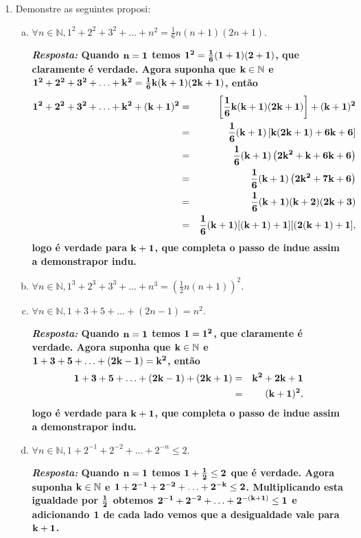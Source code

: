 \begin{enumerate}[{\bf 1.}]
\item Demonstre as seguintes proposi\cois:
\begin{enumerate}[a)]
\item $\forall n\in\mathbb{N}, 1^2+2^2+3^2+\ldots+n^2=\frac{1}{6}n(n+1)(2n+1)$.

{\bf{\it Resposta:} Quando ${\bf n=1}$ temos ${\bf 1^2=\frac{1}{6}(1+1)(2+1)}$, que claramente é verdade. Agora suponha que ${\bf k\in\mathbb{N}}$ e ${\bf 1^2+2^2+3^2+\ldots+k^2=\frac{1}{6}k(k+1)(2k+1)}$, então
\begin{eqnarray*}
{\bf 1^2+2^2+3^2+\ldots+k^2+(k+1)^2}&=&{\bf  \left[\frac{1}{6}k(k+1)(2k+1)\right]+(k+1)^2}\\
                          &=&{\bf  \frac{1}{6}(k+1)\left[k(2k+1)+6k+6\right]}\\
                          &=&{\bf  \frac{1}{6}(k+1)\left(2k^2+k+6k+6\right)}\\
                          &=&{\bf  \frac{1}{6}(k+1)\left(2k^2+7k+6\right)}\\
                          &=&{\bf  \frac{1}{6}(k+1)(k+2)(2k+3)}\\
                          &=&{\bf  \frac{1}{6}(k+1)[(k+1)+1][(2(k+1)+1]},
\end{eqnarray*}  
logo \'e verdade para ${\bf k+1}$, que completa o passo de indu\cao e assim a demonstra\cao por indu\caoi.}

\item $\forall n\in\mathbb{N}, 1^3+2^3+3^3+\ldots+n^3=(\frac{1}{2}n(n+1))^2$.
\item $\forall n\in\mathbb{N}, 1+3+5+\ldots+(2n-1)=n^2$.

{\bf{\it Resposta:} Quando ${\bf n=1}$ temos ${\bf 1=1^2}$, que claramente é verdade. Agora suponha que ${\bf k\in\mathbb{N}}$ e ${\bf 1+3+5+\ldots+(2k-1)=k^2}$, então
\begin{eqnarray*}
{\bf 1+3+5+\ldots+(2k-1)+(2k+1)}&=&{\bf  k^2+2k+1}\\
                          &=&{\bf  (k+1)^2},
\end{eqnarray*}  
logo \'e verdade para ${\bf k+1}$, que completa o passo de indu\cao e assim a demonstra\cao por indu\caoi.}

\item $\forall n\in\mathbb{N}, 1+2^{-1}+2^{-2}+\ldots+2^{-n}\leq 2$.

{\bf{\it Resposta:} Quando ${\bf n=1}$ temos ${\bf 1+\frac{1}{2}\leq 2}$ que \'e verdade. Agora suponha ${\bf k\in\mathbb{N}}$ e ${\bf 1+2^{-1}+2^{-2}+\ldots+2^{-k}\leq 2}$. Multiplicando esta igualdade por ${\bf \frac{1}{2}}$ obtemos ${\bf 2^{-1}+2^{-2}+\ldots+2^{-(k+1)}\leq 1}$ e adicionando ${\bf 1}$ de cada lado vemos que a desigualdade vale para ${\bf k+1}$.}


\end{enumerate}
\end{enumerate}
